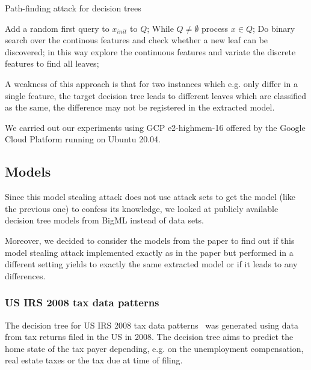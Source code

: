 \documentclass[a4paper,11pt]{article}
\begin{document}
    \begin{algorithm}
        \caption{Path-finding attack for decision trees}
	    \begin{algorithmic}[1]
		    \State Add a random first query to $x_{init}$ to $Q$;
		    \State While $Q\neq\emptyset$ process $x\in Q$;
		    \State Do binary search over the continous features and check whether a new leaf can be discovered;
		    \State in this way explore the continuous features and variate the discrete features to find all leaves;
	    \end{algorithmic}
	    \label{alg:DT-attack}
    \end{algorithm}
    
    A weakness of this approach is that for two instances which e.g. only differ in a single feature, the target decision tree leads to different leaves which are classified as the same, the difference may not be registered in the extracted model.
    
    We carried out our experiments using GCP e2-highmem-16 offered by the Google Cloud Platform running on Ubuntu 20.04.
    
    \subsection{Models}
        Since this model stealing attack does not use attack sets to get the model (like the previous one) to confess its knowledge, we looked at publicly available decision tree models from BigML instead of data sets.
        
        Moreover, we decided to consider the models from the paper to find out if this model stealing attack implemented exactly as in the paper but performed in a different setting yields to exactly the same extracted model or if it leads to any differences.
        
        \subsubsection{US IRS 2008 tax data patterns}
            The decision tree for US IRS 2008 tax data patterns~\cite{tax} was generated using data from tax returns filed in the US in 2008. The decision tree aims to predict the home state of the tax payer depending, e.g. on the unemployment compensation, real estate taxes or the tax due at time of filing. 
        
\end{document}
